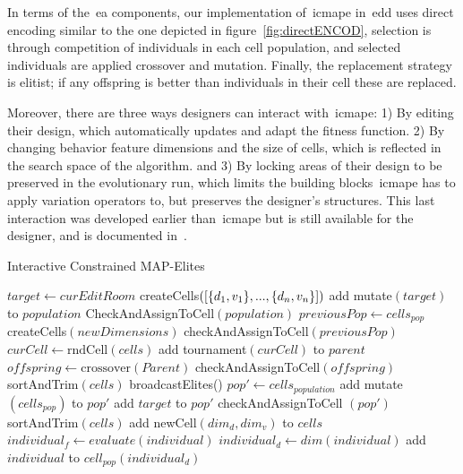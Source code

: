 In terms of the~\acrshort{ea} components, our implementation of~\acrshort{icmape} in~\acrshort{edd} uses direct encoding similar to the one depicted in figure~\ref{fig:directENCOD}, selection is through competition of individuals in each cell population, and selected individuals are applied crossover and mutation. Finally, the replacement strategy is elitist; if any offspring is better than individuals in their cell these are replaced. 

Moreover, there are three ways designers can interact with~\acrshort{icmape}: 1) By editing their design, which automatically updates and adapt the fitness function. 2) By changing behavior feature dimensions and the size of cells, which is reflected in the search space of the algorithm. and 3) By locking areas of their design to be preserved in the evolutionary run, which limits the building blocks~\acrshort{icmape} has to apply variation operators to, but preserves the designer's structures. This last interaction was developed earlier than~\acrshort{icmape} but is still available for the designer, and is documented in~\cite{Alvarez2018a}. 

\begin{algorithm}
\footnotesize
\caption{Interactive Constrained MAP-Elites}\label{alg:ICMAPE}
\begin{algorithmic}[1]
\State $target \gets curEditRoom$ 
\State createCells$(\protect[\{d_1,v_1\},...,\{d_n,v_n\}])$
     \State add mutate$(target)$ to $population$
\EndFor
\State CheckAndAssignToCell$(population)$ 
 
            \State $previousPop \gets cells_{pop}$
            \State createCells$(newDimensions)$
            \State checkAndAssignToCell$(previousPop)$ 
        \EndIf
                \State $curCell \gets \text{rndCell}(cells)$
                \State add tournament$(curCell)$ to $parent$
            \EndFor
            \State $offspring \gets  \text{crossover}(Parent)$
            \State checkAndAssignToCell$(offspring)$
        \EndRepeat
        \State sortAndTrim$(cells)$
    \EndFor
    \State broadcastElites() 
    \State $pop' \gets cells_{population}$
    \State add mutate$(cells_{pop})$ to $pop'$
    \State add $target$ to $pop'$
    \State checkAndAssignToCell $(pop')$
    \State sortAndTrim$(cells)$
\EndWhile
\EndProcedure
{}
        \State add newCell$(dim_d, dim_v)$ to $cells$
    \EndFor
\EndProcedure
{}
        \State $individual_f \gets evaluate(individual)$ 
        \State $individual_d \gets dim(individual)$
        \State add $individual$ to $cell_{pop}(individual_d)$
    \EndFor
\EndProcedure
\end{algorithmic}
\end{algorithm}

